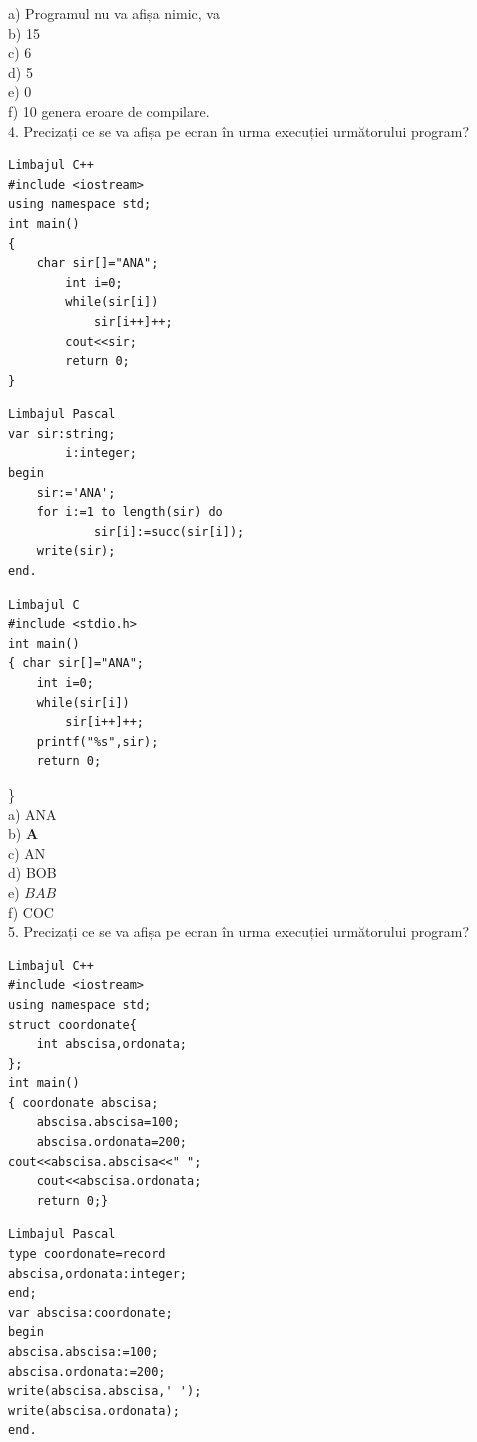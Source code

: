 \documentclass[10pt]{article}
\begin{document}
a) Programul nu va afișa nimic, va\\
b) 15\\
c) 6\\
d) 5\\
e) 0\\
f) 10 genera eroare de compilare.\\
4. Precizați ce se va afișa pe ecran în urma execuției următorului program?

\begin{verbatim}
Limbajul C++
#include <iostream>
using namespace std;
int main()
{
    char sir[]="ANA";
        int i=0;
        while(sir[i])
            sir[i++]++;
        cout<<sir;
        return 0;
}
\end{verbatim}

\begin{verbatim}
Limbajul Pascal
var sir:string;
        i:integer;
begin
    sir:='ANA';
    for i:=1 to length(sir) do
            sir[i]:=succ(sir[i]);
    write(sir);
end.
\end{verbatim}

\begin{verbatim}
Limbajul C
#include <stdio.h>
int main()
{ char sir[]="ANA";
    int i=0;
    while(sir[i])
        sir[i++]++;
    printf("%s",sir);
    return 0;
\end{verbatim}

\}\\
a) ANA\\
b) $\mathbf{A}$\\
c) AN\\
d) BOB\\
e) $B A B$\\
f) COC\\
5. Precizați ce se va afișa pe ecran în urma execuției următorului program?

\begin{verbatim}
Limbajul C++
#include <iostream>
using namespace std;
struct coordonate{
    int abscisa,ordonata;
};
int main()
{ coordonate abscisa;
    abscisa.abscisa=100;
    abscisa.ordonata=200;
cout<<abscisa.abscisa<<" ";
    cout<<abscisa.ordonata;
    return 0;}
\end{verbatim}

\begin{verbatim}
Limbajul Pascal
type coordonate=record
abscisa,ordonata:integer;
end;
var abscisa:coordonate;
begin
abscisa.abscisa:=100;
abscisa.ordonata:=200;
write(abscisa.abscisa,' ');
write(abscisa.ordonata);
end.
\end{verbatim}
\end{document}

